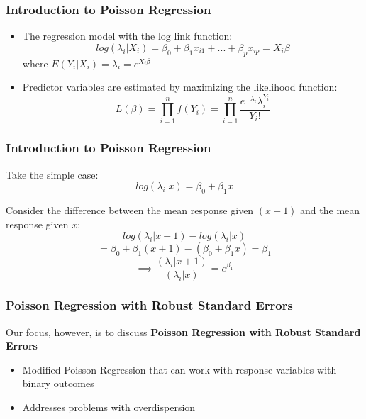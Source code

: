 \documentclass{beamer}
\begin{document}
\begin{frame}[fragile]\frametitle{Introduction to Poisson Regression}

	\begin{itemize}
		
		\item The regression model with the log link function:
 		$$ log(\lambda_i|X_i) = \beta_0 + \beta_1 x_{i1} + ... + \beta_p x_{ip} = X_i \beta $$  		
 		where $ E(Y_i|X_i) = \lambda_i = e^{X_i \beta}$

		\item Predictor variables are estimated by maximizing the likelihood function:
		$$ L(\beta) = \prod_{i=1}^{n} f(Y_i) = \prod_{i=1}^{n} \frac{ e^{-\lambda_i} \lambda_i^{Y_i} }{Y_i!} $$
		
	\end{itemize}
	
\end{frame}



\begin{frame}[fragile]\frametitle{Introduction to Poisson Regression}	
	
	Take the simple case: $$ log(\lambda_i|x) = \beta_0 + \beta_1 x $$

	Consider the difference between the mean response given $(x+1)$ and the mean response given $x$: 
			  $$ log(\lambda_i|x+1) - log(\lambda_i|x) $$
			  $$ = \beta_0 + \beta_1 (x + 1) - (\beta_0 + \beta_1 x) = \beta_1 $$
			  $$ \implies \frac{(\lambda_i|x+1)}{(\lambda_i|x)} = e^{\beta_1} $$
	
\end{frame}



\begin{frame}[fragile]\frametitle{Poisson Regression with Robust Standard Errors}
	
	Our focus, however, is to discuss \textbf{Poisson Regression with Robust Standard Errors}

	\begin{itemize}
	
		\item Modified Poisson Regression that can work with response variables with binary outcomes
		
		\item Addresses problems with overdispersion

	\end{itemize}
	
\end{frame}
\end{document}
